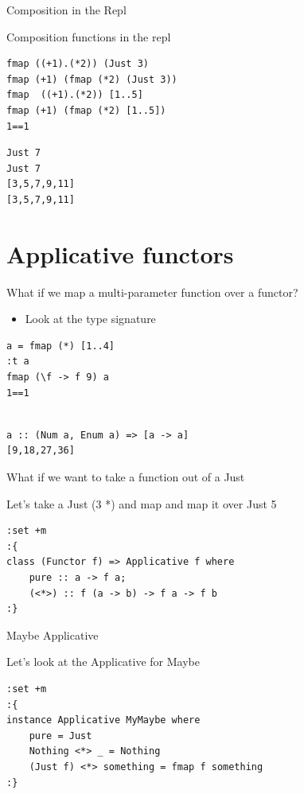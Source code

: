 \documentclass[presetation]{beamer}
\begin{document}
\begin{frame}[fragile,label={sec:org2565e11}]{Composition in the Repl}
 \begin{block}{Composition functions in the repl}
\begin{verbatim}
fmap ((+1).(*2)) (Just 3)
fmap (+1) (fmap (*2) (Just 3))
fmap  ((+1).(*2)) [1..5]
fmap (+1) (fmap (*2) [1..5])
1==1
\end{verbatim}

\begin{verbatim}
Just 7
Just 7
[3,5,7,9,11]
[3,5,7,9,11]
\end{verbatim}
\end{block}
\end{frame}

\section{Applicative functors}
\label{sec:org6141b3a}
\begin{frame}[fragile,label={sec:org3128387}]{What if we map a multi-parameter function over a functor?}
 \begin{itemize}
\item Look at the type signature
\end{itemize}
\begin{verbatim}
a = fmap (*) [1..4]
:t a
fmap (\f -> f 9) a
1==1
\end{verbatim}

\begin{verbatim}

a :: (Num a, Enum a) => [a -> a]
[9,18,27,36]
\end{verbatim}
\end{frame}

\begin{frame}[fragile,label={sec:org399a855}]{What if we want to take a function out of a Just}
 \begin{block}{Let's take a Just (3 *) and map}
and map it over Just 5
\begin{verbatim}
:set +m
:{
class (Functor f) => Applicative f where
    pure :: a -> f a;
    (<*>) :: f (a -> b) -> f a -> f b
:}
\end{verbatim}
\end{block}
\end{frame}

\begin{frame}[fragile,label={sec:org537a7aa}]{Maybe Applicative}
 \begin{block}{Let's look at the Applicative for Maybe}
\begin{verbatim}
:set +m
:{
instance Applicative MyMaybe where
    pure = Just
    Nothing <*> _ = Nothing
    (Just f) <*> something = fmap f something
:}
\end{verbatim}
\end{block}
\end{frame}
\end{document}
